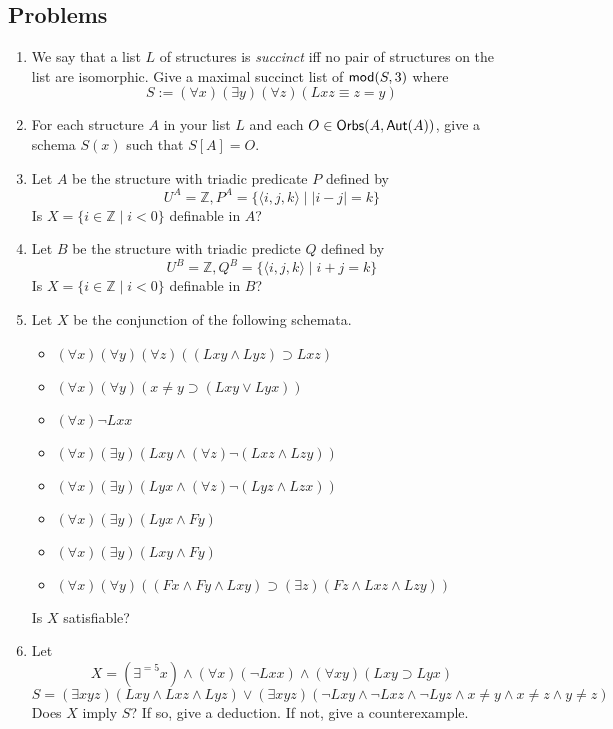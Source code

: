 \newpage
\begin{mdframed}[linewidth=1]
\section*{Problems}
\begin{enumerate}
    \item We say that a list $L$ of structures is \emph{succinct} iff no pair of structures on the list are isomorphic. Give a maximal succinct list of $\mbox{$\mathsf{mod}(S,3)$}$ where 
    \[
        S := (\forall x)(\exists y)(\forall z)(Lxz \equiv z = y)
    \]

    \item For each structure $A$ in your list $L$ and each $O \in \mbox{$\mathsf{Orbs}(A,\mbox{$\mathsf{Aut}(A)$})$}$, give a schema $S(x)$ such that $S[A] = O$. 

    \item Let $A$ be the structure with triadic predicate $P$ defined by 
    \[
        U^A = \mathbb{Z}, P^A = \{\langle i, j, k \rangle \mid |i - j| = k\}
    \]
    Is $X = \{i \in \mathbb{Z} \mid i < 0\}$ definable in $A$?

    \item Let $B$ be the structure with triadic predicte $Q$ defined by
    \[
        U^B = \mathbb{Z}, Q^B = \{\langle i, j, k \rangle \mid i + j = k\}
    \]
    Is $X = \{i \in \mathbb{Z} \mid i < 0\}$ definable in $B$?

    \item 
Let $X$ be the conjunction of the following schemata.
\begin{itemize}
\item 
$(\forall x)(\forall y)(\forall z)((Lxy \wedge Lyz) \supset Lxz)$
\item
$(\forall x)(\forall y)(x\neq y\supset(Lxy \vee Lyx))$
\item
$(\forall x) \neg Lxx$
\item 
$(\forall x)(\exists y)(Lxy\wedge (\forall z)\neg (Lxz\wedge Lzy))$
\item 
$(\forall x)(\exists y)(Lyx\wedge (\forall z)\neg (Lyz\wedge Lzx))$
\item
$(\forall x)(\exists y)(Lyx\wedge Fy)$
\item
$(\forall x)(\exists y)(Lxy\wedge Fy)$
\item
$(\forall x)(\forall y)((Fx\wedge Fy\wedge Lxy)\supset (\exists z)(Fz\wedge Lxz\wedge Lzy))$
\end{itemize}

Is $X$ satisfiable?
\iffalse    
    \item Let 
    \[
        X = (\exists y)(\forall x)(Lxy \vee Lyx)
    \]
    \[
        S = (\forall x)(\exists y)(Lxy \vee Lyx)
    \]
    Does $X$ imply $S$? If so, give a deduction. If not, give a counterexample. 
\fi
    \item Let
    \[
        X = (\exists^{=5}x) \land (\forall x)(\lnot Lxx) \land (\forall xy)(Lxy \supset Lyx)
    \]
    \[
        S = (\exists xyz)(Lxy \land Lxz \land Lyz) \vee (\exists xyz)(\lnot Lxy \land \lnot Lxz \land \lnot Lyz\land x\neq y\land x\neq z\land y\neq z)
    \]
    Does $X$ imply $S$? If so, give a deduction. If not, give a counterexample. 


\end{enumerate}
\end{mdframed}
